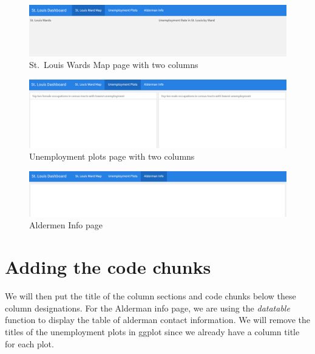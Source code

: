 \documentclass[
  krantz2]{krantz}
\begin{document}
\begin{figure}
\centering
\includegraphics{images/stl_dashboard2.png}
\caption{St.~Louis Wards Map page with two columns}
\end{figure}

\begin{figure}
\centering
\includegraphics{images/stl_dashboard3.png}
\caption{Unemployment plots page with two columns}
\end{figure}

\begin{figure}
\centering
\includegraphics{images/stl_dashboard4.png}
\caption{Aldermen Info page}
\end{figure}

\hypertarget{adding-the-code-chunks}{%
\section{Adding the code chunks}\label{adding-the-code-chunks}}

We will then put the title of the column sections and code chunks below these column designations. For the Alderman info page, we are using the \emph{datatable} function to display the table of alderman contact information. We will remove the titles of the unemployment plots in ggplot since we already have a column title for each plot.
\end{document}

